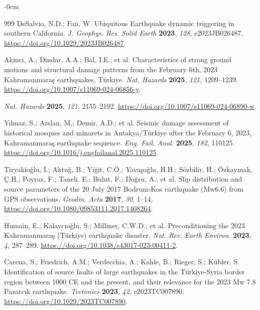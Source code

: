 \documentclass[data,article,accept,pdftex,moreauthors]{Definitions/mdpi}
\begin{document}
\begin{adjustwidth}{-\extralength}{0cm}
\begin{thebibliography}{999}
DeSalvio, N.D.; Fan, W. Ubiquitous Earthquake dynamic triggering in southern California. \emph{J. Geophys. Res. Solid Earth} \textbf{2023}, \emph{128}, e2023JB026487. \url{https://doi.org/10.1029/2023JB026487}.

Akinci, A.; Dindar, A.A.; Bal, I.E.; et al. Characteristics of strong ground motions and structural damage patterns from the February 6th, 2023 Kahramanmara\c{s} earthquakes, Türkiye. \emph{Nat. Hazards} \textbf{2025}, \emph{121}, 1209--1239. \url{https://doi.org/10.1007/s11069-024-06856-y}.

 \emph{Nat. Hazards} \textbf{2025}, \emph{121}, 2155--2192. \url{https://doi.org/10.1007/s11069-024-06890-w}.

Yılmaz, S.; Arslan, M.; Demir, A.D.; et al. Seismic damage assessment of historical mosques and minarets in Antakya/Türkiye after the February 6, 2023, Kahramanmara\c{s} earthquake sequence. \emph{Eng. Fail. Anal.} \textbf{2025}, \emph{182}, 110125. \url{https://doi.org/10.1016/j.engfailanal.2025.110125}.

Tiryakioğlu, İ.; Aktuğ, B.; Yiğit, C.Ö.; Yavaşoğlu, H.H.; Sözbilir, H.; Özkaymak, Ç.H.; Poyraz, F.; Taneli, E.; Bulut, F.; Doğru, A.; et al. Slip distribution and source parameters of the 20 July 2017 Bodrum-Kos earthquake (Mw6.6) from GPS observations. \emph{Geodin. Acta} \textbf{2017}, \emph{30}, 1--14. \url{https://doi.org/10.1080/09853111.2017.1408264}.

Hussain, E.; Kalaycıoğlu, S.; Milliner, C.W.D.; et al. Preconditioning the 2023 Kahramanmara\c{s} (Türkiye) earthquake disaster. \emph{Nat. Rev. Earth Environ.} \textbf{2023}, \emph{4}, 287--289. \url{https://doi.org/10.1038/s43017-023-00411-2}.

Carena, S.; Friedrich, A.M.; Verdecchia, A.; Kahle, B.; Rieger, S.; Kübler, S. Identification of source faults of large earthquakes in the Türkiye-Syria border region between 1000 CE and the present, and their relevance for the 2023 Mw 7.8 Pazarcık earthquake. \emph{Tectonics} \textbf{2023}, \emph{42}, e2023TC007890. \url{https://doi.org/10.1029/2023TC007890}.



\end{thebibliography}
\end{adjustwidth}
\end{document}
